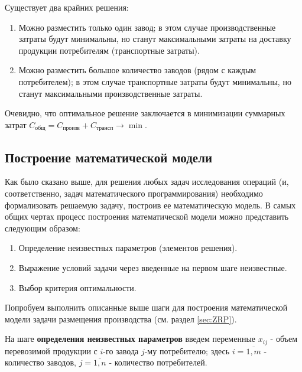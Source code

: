 \documentclass[a4paper,12pt]{report}
\begin{document}
Существует два крайних решения:
\begin{enumerate}
\item Можно разместить только один завод; в этом случае производственные затраты будут минимальны, но станут максимальными затраты на доставку продукции потребителям (транспортные затраты).
\item Можно разместить большое количество заводов (рядом с каждым потребителем); в этом случае транспортные затраты будут минимальны, но станут максимальными производственные затраты.
\end{enumerate}

Очевидно, что оптимальное решение заключается в минимизации суммарных затрат $C_{\text{общ}} = C_{\text{произв}} + C_{\text{трансп}} \rightarrow \min$.

\subsection{Построение математической модели}
Как было сказано выше, для решения любых задач исследования операций (и, соответственно, задач математического программирования) необходимо формализовать решаемую задачу, построив ее математическую модель. В самых общих чертах процесс построения математической модели можно представить следующим образом:
\begin{enumerate} 
\item Определение неизвестных параметров (элементов решения).
\item Выражение условий задачи через введенные на первом шаге неизвестные.
\item Выбор критерия оптимальности.
\end{enumerate}

Попробуем выполнить описанные выше шаги для построения математической модели задачи размещения производства (см. раздел \ref{sec:ZRP}). 

На шаге \textbf{определения неизвестных параметров} введем переменные $x_{ij}$ - объем перевозимой продукции с $i$-го завода $j$-му потребителю; здесь $i=\overline{1,m}$ - количество заводов, $j=\overline{1,n}$ - количество потребителей. 
\end{document}

